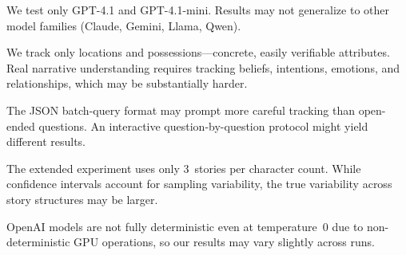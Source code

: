 We test only GPT-4.1 and GPT-4.1-mini.
Results may not generalize to other model families (Claude, Gemini, Llama, Qwen).

We track only locations and possessions---concrete, easily verifiable attributes.
Real narrative understanding requires tracking beliefs, intentions, emotions, and relationships, which may be substantially harder.

The JSON batch-query format may prompt more careful tracking than open-ended questions.
An interactive question-by-question protocol might yield different results.

The extended experiment uses only 3~stories per character count.
While confidence intervals account for sampling variability, the true variability across story structures may be larger.

OpenAI models are not fully deterministic even at temperature~0 due to non-deterministic GPU operations, so our results may vary slightly across runs.
